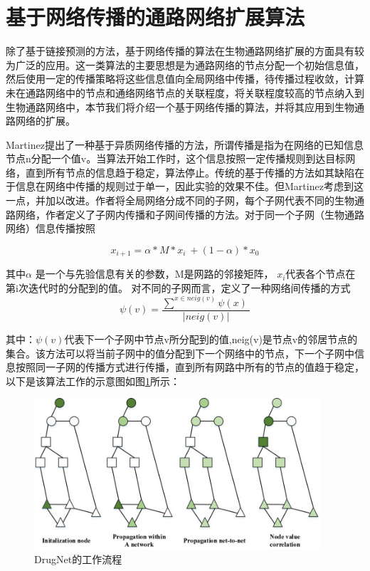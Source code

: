 \section{基于网络传播的通路网络扩展算法}
除了基于链接预测的方法，基于网络传播的算法在生物通路网络扩展的方面具有较为广泛的应用。这一类算法的主要思想是为通路网络的节点分配一个初始信息值，然后使用一定的传播策略将这些信息值向全局网络中传播，待传播过程收敛，计算未在通路网络中的节点和通络网络节点的关联程度，将关联程度较高的节点纳入到生物通路网络中，本节我们将介绍一个基于网络传播的算法，并将其应用到生物通路网络的扩展。

Martinez\cite{}提出了一种基于异质网络传播的方法，所谓传播是指为在网络的已知信息节点n分配一个值v。当算法开始工作时，这个信息按照一定传播规则到达目标网络，直到所有节点的信息趋于稳定，算法停止。传统的基于传播的方法如\cite{}其缺陷在于信息在网络中传播的规则过于单一，因此实验的效果不佳。但Martinez\cite{}考虑到这一点，并加以改进。作者将全局网络分成不同的子网，每个子网代表不同的生物通路网络，作者定义了子网内传播和子网间传播的方法。对于同一个子网（生物通路网络）信息传播按照

\begin{equation}
x_{i+1} =\alpha *M*x_{i} \ +( 1-\alpha ) *x_{0}
\label{eq321}
\end{equation}

其中$\alpha$ 是一个与先验信息有关的参数，M是网路的邻接矩阵， $x_{i}$代表各个节点在第i次迭代时的分配到的值。 对不同的子网而言，定义了一种网络间传播的方式
\begin{equation}
\psi (v) =\frac{\sum ^{x\in neig(v)} \psi (x) \ }{|neig(v) |}
\label{eq322}
\end{equation}

其中：$\psi(v)$代表下一个子网中节点v所分配到的值,neig(v)是节点v的邻居节点的集合。该方法可以将当前子网中的值分配到下一个网络中的节点，下一个子网中信息按照同一子网的传播方式进行传播，直到所有网路中所有的节点的值趋于稳定，以下是该算法工作的示意图如图\ref{fig41}所示：

\begin{figure}[h]
\centering
\includegraphics[width = 0.95\textwidth]{workflow}
\caption[fig41]{DrugNet的工作流程}
\label{fig41}
\end{figure}


